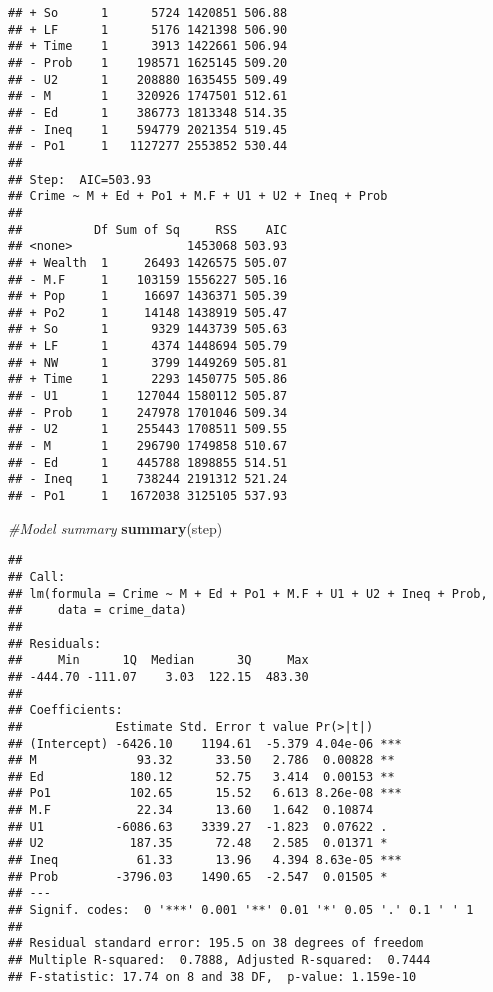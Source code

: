 \documentclass[
]{article}
\newenvironment{Shaded}{\begin{snugshade}}{\end{snugshade}}
\newcommand{\CommentTok}[1]{\textcolor[rgb]{0.56,0.35,0.01}{\textit{#1}}}
\newcommand{\KeywordTok}[1]{\textcolor[rgb]{0.13,0.29,0.53}{\textbf{#1}}}
\newcommand{\NormalTok}[1]{#1}
\begin{document}
\begin{verbatim}
## + So      1      5724 1420851 506.88
## + LF      1      5176 1421398 506.90
## + Time    1      3913 1422661 506.94
## - Prob    1    198571 1625145 509.20
## - U2      1    208880 1635455 509.49
## - M       1    320926 1747501 512.61
## - Ed      1    386773 1813348 514.35
## - Ineq    1    594779 2021354 519.45
## - Po1     1   1127277 2553852 530.44
## 
## Step:  AIC=503.93
## Crime ~ M + Ed + Po1 + M.F + U1 + U2 + Ineq + Prob
## 
##          Df Sum of Sq     RSS    AIC
## <none>                1453068 503.93
## + Wealth  1     26493 1426575 505.07
## - M.F     1    103159 1556227 505.16
## + Pop     1     16697 1436371 505.39
## + Po2     1     14148 1438919 505.47
## + So      1      9329 1443739 505.63
## + LF      1      4374 1448694 505.79
## + NW      1      3799 1449269 505.81
## + Time    1      2293 1450775 505.86
## - U1      1    127044 1580112 505.87
## - Prob    1    247978 1701046 509.34
## - U2      1    255443 1708511 509.55
## - M       1    296790 1749858 510.67
## - Ed      1    445788 1898855 514.51
## - Ineq    1    738244 2191312 521.24
## - Po1     1   1672038 3125105 537.93
\end{verbatim}

\begin{Shaded}
\begin{Highlighting}[]
\CommentTok{#Model summary}
\KeywordTok{summary}\NormalTok{(step)}
\end{Highlighting}
\end{Shaded}

\begin{verbatim}
## 
## Call:
## lm(formula = Crime ~ M + Ed + Po1 + M.F + U1 + U2 + Ineq + Prob, 
##     data = crime_data)
## 
## Residuals:
##     Min      1Q  Median      3Q     Max 
## -444.70 -111.07    3.03  122.15  483.30 
## 
## Coefficients:
##             Estimate Std. Error t value Pr(>|t|)    
## (Intercept) -6426.10    1194.61  -5.379 4.04e-06 ***
## M              93.32      33.50   2.786  0.00828 ** 
## Ed            180.12      52.75   3.414  0.00153 ** 
## Po1           102.65      15.52   6.613 8.26e-08 ***
## M.F            22.34      13.60   1.642  0.10874    
## U1          -6086.63    3339.27  -1.823  0.07622 .  
## U2            187.35      72.48   2.585  0.01371 *  
## Ineq           61.33      13.96   4.394 8.63e-05 ***
## Prob        -3796.03    1490.65  -2.547  0.01505 *  
## ---
## Signif. codes:  0 '***' 0.001 '**' 0.01 '*' 0.05 '.' 0.1 ' ' 1
## 
## Residual standard error: 195.5 on 38 degrees of freedom
## Multiple R-squared:  0.7888, Adjusted R-squared:  0.7444 
## F-statistic: 17.74 on 8 and 38 DF,  p-value: 1.159e-10
\end{verbatim}
\end{document}
